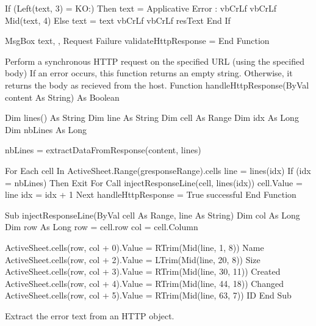 \documentclass[letterpaper,10pt,english]{sphinxmanual}
\begin{document}
\begin{sphinxVerbatim}[commandchars=\\\{\}]
      If (Left(text, 3) = \PYGZdq{}KO:\PYGZdq{}) Then
            text = \PYGZdq{}Applicative Error :\PYGZdq{} \PYGZam{} vbCrLf \PYGZam{} vbCrLf \PYGZam{} Mid(text, 4)
      Else
            text = text \PYGZam{} vbCrLf \PYGZam{} \PYGZdq{}\PYGZus{}\PYGZus{}\PYGZus{}\PYGZus{}\PYGZus{}\PYGZus{}\PYGZus{}\PYGZus{}\PYGZus{}\PYGZus{}\PYGZus{}\PYGZus{}\PYGZus{}\PYGZus{}\PYGZus{}\PYGZus{}\PYGZus{}\PYGZus{}\PYGZus{}\PYGZus{}\PYGZus{}\PYGZus{}\PYGZus{}\PYGZus{}\PYGZus{}\PYGZus{}\PYGZus{}\PYGZus{}\PYGZus{}\PYGZus{}\PYGZus{}\PYGZus{}\PYGZus{}\PYGZus{}\PYGZus{}\PYGZus{}\PYGZus{}\PYGZdq{} \PYGZam{} vbCrLf \PYGZam{} resText
      End If

      MsgBox text, , \PYGZdq{}Request Failure\PYGZdq{}
      validateHttpResponse = \PYGZdq{}\PYGZdq{}
End Function

\PYGZsq{} Perform a synchronous HTTP request on the specified URL (using the specified body)
\PYGZsq{} If an error occurs, this function returns an empty string.
\PYGZsq{} Otherwise, it returns the body as recieved from the host.
\PYGZsq{}
Function handleHttpResponse(ByVal content As String) As Boolean

      Dim lines() As String
      \PYGZsq{}    Dim line As String
      Dim cell As Range
      Dim idx As Long
      Dim nbLines As Long

      nbLines = extractDataFromResponse(content, lines)

      For Each cell In ActiveSheet.Range(g\PYGZus{}responseRange).cells
      \PYGZsq{}     line = lines(idx)
            If (idx = nbLines) Then Exit For
            Call injectResponseLine(cell, lines(idx))
      \PYGZsq{}     cell.Value = line
            idx = idx + 1
      Next
      handleHttpResponse = True   \PYGZsq{} successful
End Function


Sub injectResponseLine(ByVal cell As Range, line As String)
      Dim col As Long
      Dim row As Long
      row = cell.row
      col = cell.Column

      ActiveSheet.cells(row, col + 0).Value = RTrim(Mid(line, 1, 8))               \PYGZsq{} Name
      ActiveSheet.cells(row, col + 2).Value = LTrim(Mid(line, 20, 8))              \PYGZsq{} Size
      ActiveSheet.cells(row, col + 3).Value = RTrim(Mid(line, 30, 11))             \PYGZsq{} Created
      ActiveSheet.cells(row, col + 4).Value = RTrim(Mid(line, 44, 18))             \PYGZsq{} Changed
      ActiveSheet.cells(row, col + 5).Value = RTrim(Mid(line, 63, 7))              \PYGZsq{} ID
End Sub


\PYGZsq{} Extract the error text from an HTTP object.
\PYGZsq{}


\end{sphinxVerbatim}
\end{document}
